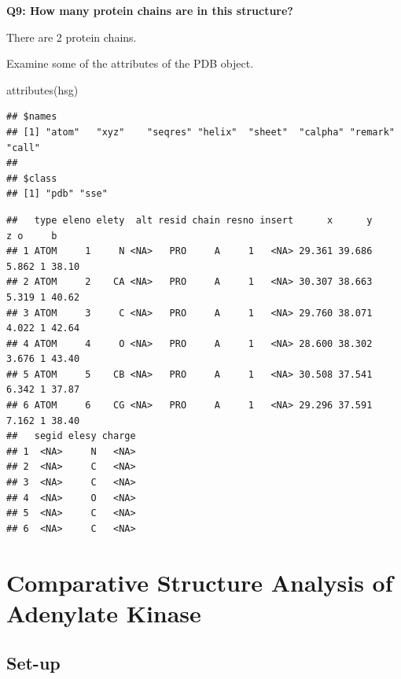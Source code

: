 \documentclass[
]{article}
\newenvironment{Shaded}{\begin{snugshade}}{\end{snugshade}}
\newcommand{\FunctionTok}[1]{\textcolor[rgb]{0.00,0.00,0.00}{#1}}
\newcommand{\NormalTok}[1]{#1}
\newcommand{\SpecialCharTok}[1]{\textcolor[rgb]{0.00,0.00,0.00}{#1}}
\begin{document}
\textbf{Q9: How many protein chains are in this structure?}

There are 2 protein chains.

Examine some of the attributes of the PDB object.

\begin{Shaded}
\begin{Highlighting}[]
\FunctionTok{attributes}\NormalTok{(hsg)}
\end{Highlighting}
\end{Shaded}

\begin{verbatim}
## $names
## [1] "atom"   "xyz"    "seqres" "helix"  "sheet"  "calpha" "remark" "call"  
## 
## $class
## [1] "pdb" "sse"
\end{verbatim}

\begin{Shaded}
\end{Shaded}

\begin{verbatim}
##   type eleno elety  alt resid chain resno insert      x      y     z o     b
## 1 ATOM     1     N <NA>   PRO     A     1   <NA> 29.361 39.686 5.862 1 38.10
## 2 ATOM     2    CA <NA>   PRO     A     1   <NA> 30.307 38.663 5.319 1 40.62
## 3 ATOM     3     C <NA>   PRO     A     1   <NA> 29.760 38.071 4.022 1 42.64
## 4 ATOM     4     O <NA>   PRO     A     1   <NA> 28.600 38.302 3.676 1 43.40
## 5 ATOM     5    CB <NA>   PRO     A     1   <NA> 30.508 37.541 6.342 1 37.87
## 6 ATOM     6    CG <NA>   PRO     A     1   <NA> 29.296 37.591 7.162 1 38.40
##   segid elesy charge
## 1  <NA>     N   <NA>
## 2  <NA>     C   <NA>
## 3  <NA>     C   <NA>
## 4  <NA>     O   <NA>
## 5  <NA>     C   <NA>
## 6  <NA>     C   <NA>
\end{verbatim}

\hypertarget{comparative-structure-analysis-of-adenylate-kinase}{%
\section{Comparative Structure Analysis of Adenylate
Kinase}\label{comparative-structure-analysis-of-adenylate-kinase}}

\hypertarget{set-up}{%
\subsection{Set-up}\label{set-up}}
\end{document}
